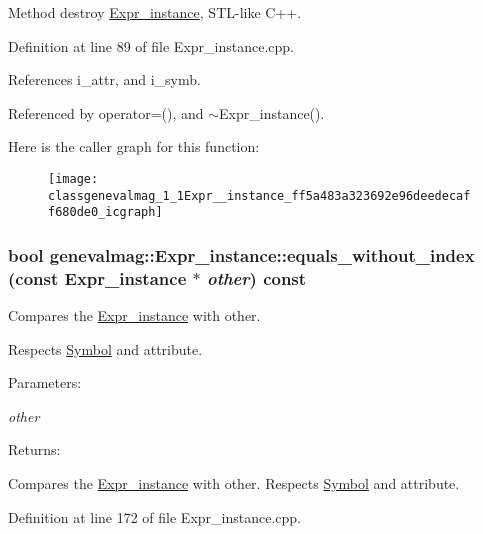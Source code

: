 Method destroy \hyperlink{classgenevalmag_1_1Expr__instance}{Expr\_\-instance}, STL-like C++. 

Definition at line 89 of file Expr\_\-instance.cpp.

References i\_\-attr, and i\_\-symb.

Referenced by operator=(), and $\sim$Expr\_\-instance().

Here is the caller graph for this function:\nopagebreak
\begin{figure}[H]
\begin{center}
\leavevmode
\texttt{[image: classgenevalmag\_1\_1Expr\_\_instance\_ff5a483a323692e96deedecaff680de0\_icgraph]}
\end{center}
\end{figure}
\hypertarget{classgenevalmag_1_1Expr__instance_fc3206f63c77c3fc8bbfdf4d2ef7de2e}{
\subsubsection[{equals\_\-without\_\-index}]{\setlength{\rightskip}{0pt plus 5cm}bool genevalmag::Expr\_\-instance::equals\_\-without\_\-index (const {\bf Expr\_\-instance} $\ast$ {\em other}) const}}
\label{classgenevalmag_1_1Expr__instance_fc3206f63c77c3fc8bbfdf4d2ef7de2e}


Compares the \hyperlink{classgenevalmag_1_1Expr__instance}{Expr\_\-instance} with other.\par
 Respects \hyperlink{classgenevalmag_1_1Symbol}{Symbol} and attribute. \begin{Desc}
\item[Parameters:]
\begin{description}
\item[{\em other}]\end{description}
\end{Desc}
\begin{Desc}
\item[Returns:]\end{Desc}
Compares the \hyperlink{classgenevalmag_1_1Expr__instance}{Expr\_\-instance} with other. Respects \hyperlink{classgenevalmag_1_1Symbol}{Symbol} and attribute. 

Definition at line 172 of file Expr\_\-instance.cpp.

